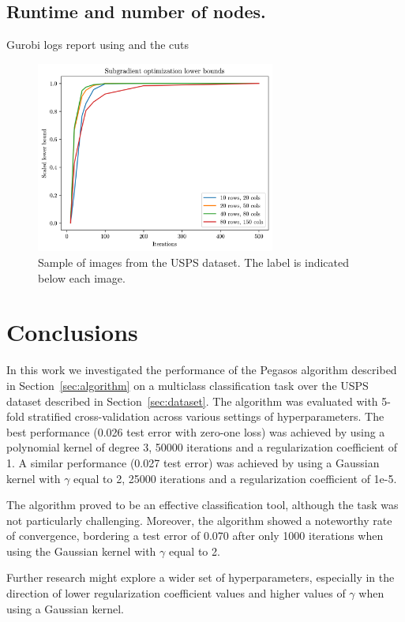 \documentclass[runningheads]{llncs}
\begin{document}
\subsection{Runtime and number of nodes.}


Gurobi logs report using and the cuts


















\begin{figure}
  \center
  \includegraphics[width=0.7\textwidth]{img/subgrad_lb.png}
  \caption{Sample of images from the USPS dataset. The label is indicated below each image.} 
  \label{fig:dataset:digits}
\end{figure}


\section{Conclusions}
\label{sec:conclusions}

In this work we investigated the performance of the Pegasos algorithm described in Section~\ref{sec:algorithm} on a multiclass classification task over the USPS dataset described in Section~\ref{sec:dataset}. The algorithm was evaluated with 5-fold stratified cross-validation across various settings of hyperparameters. The best performance (0.026 test error with zero-one loss) was achieved by using a polynomial kernel of degree 3, 50000 iterations and a regularization coefficient of 1. A similar performance (0.027 test error) was achieved by using a Gaussian kernel with $\gamma$ equal to 2, 25000 iterations and a regularization coefficient of 1e-5.

The algorithm proved to be an effective classification tool, although the task was not particularly challenging. Moreover, the algorithm showed a noteworthy rate of convergence, bordering a test error of 0.070 after only 1000 iterations when using the Gaussian kernel with $\gamma$ equal to 2.

Further research might explore a wider set of hyperparameters, especially in the direction of lower regularization coefficient values and higher values of $\gamma$ when using a Gaussian kernel.



\end{document}
